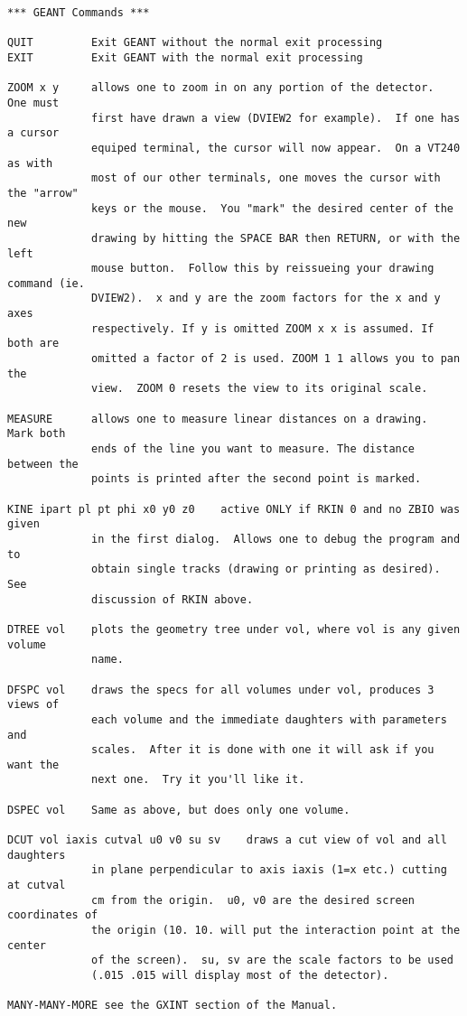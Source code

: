 \begin{verbatim}
*** GEANT Commands ***

QUIT         Exit GEANT without the normal exit processing
EXIT         Exit GEANT with the normal exit processing

ZOOM x y     allows one to zoom in on any portion of the detector.  One must
             first have drawn a view (DVIEW2 for example).  If one has a cursor
             equiped terminal, the cursor will now appear.  On a VT240 as with
             most of our other terminals, one moves the cursor with the "arrow"
             keys or the mouse.  You "mark" the desired center of the new
             drawing by hitting the SPACE BAR then RETURN, or with the left
             mouse button.  Follow this by reissueing your drawing command (ie.
             DVIEW2).  x and y are the zoom factors for the x and y axes
             respectively. If y is omitted ZOOM x x is assumed. If both are
             omitted a factor of 2 is used. ZOOM 1 1 allows you to pan the
             view.  ZOOM 0 resets the view to its original scale.

MEASURE      allows one to measure linear distances on a drawing.  Mark both
             ends of the line you want to measure. The distance between the
             points is printed after the second point is marked.

KINE ipart pl pt phi x0 y0 z0    active ONLY if RKIN 0 and no ZBIO was given
             in the first dialog.  Allows one to debug the program and to
             obtain single tracks (drawing or printing as desired).  See
             discussion of RKIN above.

DTREE vol    plots the geometry tree under vol, where vol is any given volume
             name.

DFSPC vol    draws the specs for all volumes under vol, produces 3 views of
             each volume and the immediate daughters with parameters and
             scales.  After it is done with one it will ask if you want the
             next one.  Try it you'll like it.

DSPEC vol    Same as above, but does only one volume.

DCUT vol iaxis cutval u0 v0 su sv    draws a cut view of vol and all daughters
             in plane perpendicular to axis iaxis (1=x etc.) cutting at cutval
             cm from the origin.  u0, v0 are the desired screen coordinates of
             the origin (10. 10. will put the interaction point at the center
             of the screen).  su, sv are the scale factors to be used
             (.015 .015 will display most of the detector).

MANY-MANY-MORE see the GXINT section of the Manual.
\end{verbatim}

